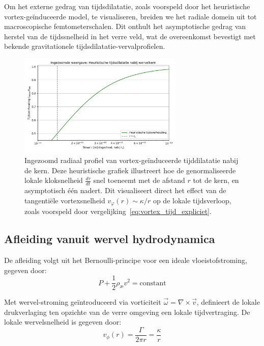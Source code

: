 Om het externe gedrag van tijdsdilatatie, zoals voorspeld door het heuristische vortex-geïnduceerde model, te visualiseren, breiden we het radiale domein uit tot macroscopische femtometerschalen. Dit onthult het asymptotische gedrag van herstel van de tijdssnelheid in het verre veld, wat de overeenkomst bevestigt met bekende gravitationele tijdsdilatatie-vervalprofielen.

\begin{figure}[H]
    \centering
    \includegraphics[width=0.7\textwidth]{06-HeuristicTimeDilation4_nl}
    \caption{
        Ingezoomd radiaal profiel van vortex-geïnduceerde tijddilatatie nabij de kern.
        Deze heuristische grafiek illustreert hoe de genormaliseerde lokale kloksnelheid
        $\frac{d\tau}{dt}$ snel toeneemt met de afstand $r$ tot de kern,
        en asymptotisch één nadert. Dit visualiseert direct het effect van
        de tangentiële vortexsnelheid $v_\varphi(r) \sim \kappa / r$ op de lokale tijdsverloop,
        zoals voorspeld door vergelijking~\eqref{eq:vortex_tijd_expliciet}.
    }
    \label{fig:HeuristicTimeDilation}
\end{figure}

\subsection{Afleiding vanuit wervel hydrodynamica}

De afleiding volgt uit het Bernoulli-principe voor een ideale vloeistofstroming, gegeven door:
\begin{equation}\label{eq:Bernoulli}
    P + \frac{1}{2}\rho_\text{\ae} v^2 = \text{constant}
\end{equation}

Met wervel-stroming geïntroduceerd via vorticiteit $\vec{\omega} = \nabla \times \vec{v}$, definieert de lokale drukverlaging ten opzichte van de verre omgeving een lokale tijdvertraging. De lokale wervelsnelheid is gegeven door:
\begin{equation}\label{eq:tangentiele_snelheid}
    v_{\phi}(r) = \frac{\Gamma}{2\pi r} = \frac{\kappa}{r}
\end{equation}

